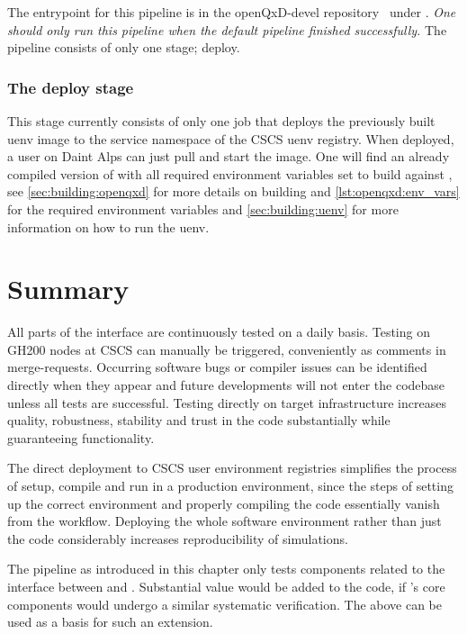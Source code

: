 The entrypoint for this pipeline is in the openQxD-devel repository~\cite{gitlab:openqxd-devel} under .
\emph{One should only run this pipeline when the default pipeline finished successfully.}
The pipeline consists of only one stage; deploy.

\subsubsection{The deploy stage}

This stage currently consists of only one job that deploys the previously built uenv image to the service namespace of the CSCS uenv registry.
When deployed, a user on Daint Alps can just pull and start the image.
One will find an already compiled version of \quda with all required environment variables set to build \openqxd against \quda, see \cref{sec:building:openqxd} for more details on building \openqxd and \cref{lst:openqxd:env_vars} for the required environment variables and \cref{sec:building:uenv} for more information on how to run the uenv.

\section{Summary}
\label{sec:cicd:summary}

All parts of the interface are continuously tested on a daily basis.
Testing on GH200 nodes at CSCS can manually be triggered, conveniently as comments in merge-requests.
Occurring software bugs or compiler issues can be identified directly when they appear and future developments will not enter the codebase unless all tests are successful.
Testing directly on target infrastructure increases quality, robustness, stability and trust in the code substantially while guaranteeing functionality.

The direct deployment to CSCS user environment registries simplifies the process of setup, compile and run in a production environment, since the steps of setting up the correct environment and properly compiling the code essentially vanish from the workflow.
Deploying the whole software environment rather than just the code considerably increases reproducibility of simulations.

The pipeline as introduced in this chapter only tests components related to the interface between \openqxd and \quda.
Substantial value would be added to the code, if \openqxd's core components would undergo a similar systematic verification.
The above can be used as a basis for such an extension.

